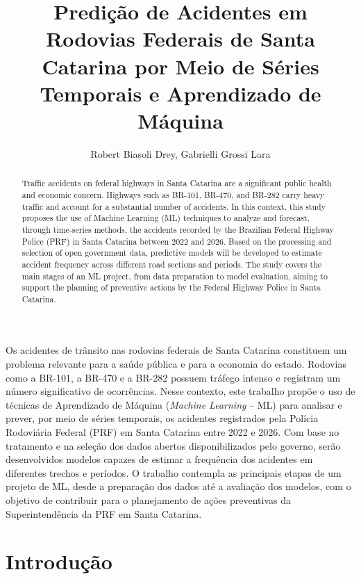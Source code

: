 \documentclass[12pt]{article}
\title{Predição de Acidentes em Rodovias Federais de Santa Catarina por Meio de Séries Temporais e Aprendizado de Máquina}
\author{Robert Biasoli Drey\inst{1}, Gabrielli Grossi Lara\inst{1}}
\begin{document}
 

\maketitle

\begin{abstract}
Traffic accidents on federal highways in Santa Catarina are a significant public health and economic concern. Highways such as BR-101, BR-470, and BR-282 carry heavy traffic and account for a substantial number of accidents. In this context, this study proposes the use of Machine Learning (ML) techniques to analyze and forecast, through time-series methods, the accidents recorded by the Brazilian Federal Highway Police (PRF) in Santa Catarina between 2022 and 2026. Based on the processing and selection of open government data, predictive models will be developed to estimate accident frequency across different road sections and periods. The study covers the main stages of an ML project, from data preparation to model evaluation, aiming to support the planning of preventive actions by the Federal Highway Police in Santa Catarina.

\end{abstract}
     
\begin{resumo} 
Os acidentes de trânsito nas rodovias federais de Santa Catarina constituem um problema relevante para a saúde pública e para a economia do estado. Rodovias como a BR-101, a BR-470 e a BR-282 possuem tráfego intenso e registram um número significativo de ocorrências. Nesse contexto, este trabalho propõe o uso de técnicas de Aprendizado de Máquina (\textit{Machine Learning} -- ML) para analisar e prever, por meio de séries temporais, os acidentes registrados pela Polícia Rodoviária Federal (PRF) em Santa Catarina entre 2022 e 2026. Com base no tratamento e na seleção dos dados abertos disponibilizados pelo governo, serão desenvolvidos modelos capazes de estimar a frequência dos acidentes em diferentes trechos e períodos. O trabalho contempla as principais etapas de um projeto de ML, desde a preparação dos dados até a avaliação dos modelos, com o objetivo de contribuir para o planejamento de ações preventivas da Superintendência da PRF em Santa Catarina.

\end{resumo}

\section{Introdução}
\end{document}
